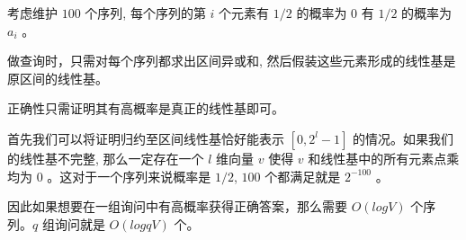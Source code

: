 考虑维护 $100$ 个序列, 每个序列的第 $i$ 个元素有 $1/2$ 的概率为 $0$ 有 $1/2$ 的概率为 $a_i$ 。

做查询时，只需对每个序列都求出区间异或和, 然后假装这些元素形成的线性基是原区间的线性基。

正确性只需证明其有高概率是真正的线性基即可。

首先我们可以将证明归约至区间线性基恰好能表示 $[0,2^{l}-1]$ 的情况。如果我们的线性基不完整, 那么一定存在一个 $l$ 维向量 $v$ 使得 $v$ 和线性基中的所有元素点乘均为 $0$ 。这对于一个序列来说概率是 $1/2$, $100$ 个都满足就是 $2^{-100}$ 。

因此如果想要在一组询问中有高概率获得正确答案，那么需要 $O(logV)$ 个序列。$q$ 组询问就是 $O(logqV)$ 个。